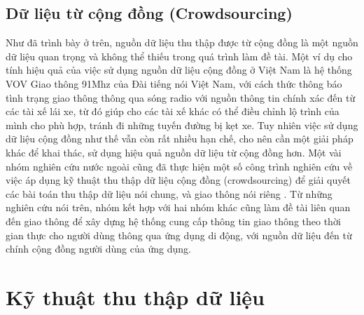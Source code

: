 \subsection{Dữ liệu từ cộng đồng (Crowdsourcing)}
Như đã trình bày ở trên, nguồn dữ liệu thu thập được từ cộng đồng là một nguồn dữ liệu quan trọng và không thể thiếu trong quá trình làm đề tài. Một ví dụ cho tính hiệu quả của việc sử dụng nguồn dữ liệu cộng đồng ở Việt Nam là hệ thống VOV Giao thông 91Mhz của Đài tiếng nói Việt Nam, với cách thức thông báo tình trạng giao thông thông qua sóng radio với nguồn thông tin chính xác đến từ các tài xế lái xe, từ đó giúp cho các tài xế khác có thể điều chỉnh lộ trình của mình cho phù hợp, tránh đi những tuyến đường bị kẹt xe. Tuy nhiên việc sử dụng dữ liệu cộng đồng như thế vẫn còn rất nhiều hạn chế, cho nên cần một giải pháp khác để khai thác, sử dụng hiệu quả nguồn dữ liệu từ cộng đồng hơn. Một vài nhóm nghiên cứu nước ngoài cũng đã thực hiện một số công trình nghiên cứu về việc áp dụng kỹ thuật thu thập dữ liệu cộng đồng (crowdsourcing) để giải quyết các bài toán thu thập dữ liệu nói chung, và giao thông nói riêng \cite{CROWND1} \cite{CROWND2} \cite{CROWND3} \cite{CROWND4}. Từ những nghiên cứu nói trên, nhóm kết hợp với hai nhóm khác cũng làm đề tài liên quan đến giao thông để xây dựng hệ thống cung cấp thông tin giao thông theo thời gian thực cho người dùng thông qua ứng dụng di động, với nguồn dữ liệu đến từ chính cộng đồng người dùng của ứng dụng.

\section{Kỹ thuật thu thập dữ liệu}
